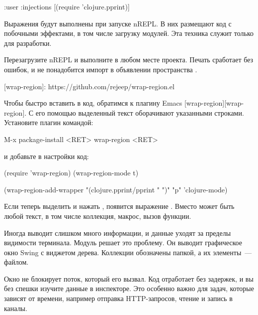\begin{english}
  \begin{clojure}
{:user
 :injections [(require 'clojure.pprint)]}
  \end{clojure}
\end{english}

Выражения  будут выполнены при запуске nREPL. В них размещают код с побочными эффектами, в том числе загрузку модулей. Эта техника служит только для разработки.

Перезагрузите nREPL и выполните  в любом месте проекта. Печать сработает без ошибок, и не понадобится импорт  в объявлении пространства .

[wrap-region]: https://github.com/rejeep/wrap-region.el

Чтобы быстро вставить  в код, обратимся к плагину Emacs [wrap-region][wrap-region]. С его помощью выделенный текст оборачивают указанными строками. Установите плагин командой:

\begin{english}
  \begin{text}
M-x package-install <RET> wrap-region <RET>
  \end{text}
\end{english}

и добавьте в настройки код:

\begin{english}
  \begin{clojure}
(require 'wrap-region)
(wrap-region-mode t)

(wrap-region-add-wrapper "(clojure.pprint/pprint " ")" "p" 'clojure-mode)
  \end{clojure}
\end{english}

Если теперь выделить  и нажать , появится выражение . Вместо  может быть любой текст, в том числе коллекция, макрос, вызов функции.

Иногда  выводит слишком много информации, и данные уходят за пределы видимости терминала. Модуль  решает это проблему. Он выводит графическое окно Swing с виджетом дерева. Коллекции обозначены папкой, а их элементы~--- файлом.

Окно не блокирует поток, который его вызвал. Код отработает без задержек, и вы без спешки изучите данные в инспекторе. Это особенно важно для задач, которые зависят от времени, например отправка HTTP-запросов, чтение и запись в каналы.

